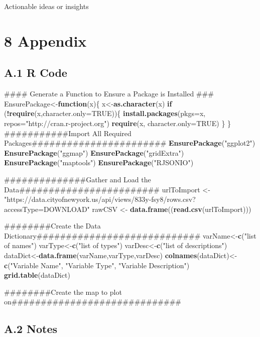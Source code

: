 \documentclass[]{article}
\newenvironment{Shaded}{\begin{snugshade}}{\end{snugshade}}
\newcommand{\KeywordTok}[1]{\textcolor[rgb]{0.13,0.29,0.53}{\textbf{#1}}}
\newcommand{\DataTypeTok}[1]{\textcolor[rgb]{0.13,0.29,0.53}{#1}}
\newcommand{\StringTok}[1]{\textcolor[rgb]{0.31,0.60,0.02}{#1}}
\newcommand{\OtherTok}[1]{\textcolor[rgb]{0.56,0.35,0.01}{#1}}
\newcommand{\ControlFlowTok}[1]{\textcolor[rgb]{0.13,0.29,0.53}{\textbf{#1}}}
\newcommand{\OperatorTok}[1]{\textcolor[rgb]{0.81,0.36,0.00}{\textbf{#1}}}
\newcommand{\AlertTok}[1]{\textcolor[rgb]{0.94,0.16,0.16}{#1}}
\newcommand{\NormalTok}[1]{#1}
\begin{document}
Actionable ideas or insights

\section{8 Appendix}\label{appendix}

\subsection{A.1 R Code}\label{a.1-r-code}

\begin{Shaded}
\begin{Highlighting}[]
\NormalTok{#### Generate a Function to Ensure a Package is Installed }\AlertTok{###}
\NormalTok{EnsurePackage<-}\ControlFlowTok{function}\NormalTok{(x)\{}
\NormalTok{  x<-}\KeywordTok{as.character}\NormalTok{(x)}
  \ControlFlowTok{if}\NormalTok{ (}\OperatorTok{!}\KeywordTok{require}\NormalTok{(x,}\DataTypeTok{character.only=}\OtherTok{TRUE}\NormalTok{))\{}
    \KeywordTok{install.packages}\NormalTok{(}\DataTypeTok{pkgs=}\NormalTok{x, }\DataTypeTok{repos=}\StringTok{"http://cran.r-project.org"}\NormalTok{)}
    \KeywordTok{require}\NormalTok{(x, }\DataTypeTok{character.only=}\OtherTok{TRUE}\NormalTok{)}
\NormalTok{  \}}
\NormalTok{\}}
\NormalTok{###########Import All Required Packages#######################}
\KeywordTok{EnsurePackage}\NormalTok{(}\StringTok{"ggplot2"}\NormalTok{)}
\KeywordTok{EnsurePackage}\NormalTok{(}\StringTok{"ggmap"}\NormalTok{)}
\KeywordTok{EnsurePackage}\NormalTok{(}\StringTok{"gridExtra"}\NormalTok{)}
\KeywordTok{EnsurePackage}\NormalTok{(}\StringTok{"maptools"}\NormalTok{)}
\KeywordTok{EnsurePackage}\NormalTok{(}\StringTok{"RJSONIO"}\NormalTok{)}

\NormalTok{##############Gather and Load the Data########################}
\NormalTok{urlToImport <-}\StringTok{ "https://data.cityofnewyork.us/api/views/833y-fsy8/rows.csv?accessType=DOWNLOAD"}
\NormalTok{rawCSV <-}\StringTok{ }\KeywordTok{data.frame}\NormalTok{((}\KeywordTok{read.csv}\NormalTok{(urlToImport)))}

\NormalTok{########Create the Data Dictionary############################}
\NormalTok{varName<-}\KeywordTok{c}\NormalTok{(}\StringTok{"list of names"}\NormalTok{)}
\NormalTok{varType<-}\KeywordTok{c}\NormalTok{(}\StringTok{"list of types"}\NormalTok{)}
\NormalTok{varDesc<-}\KeywordTok{c}\NormalTok{(}\StringTok{"list of descriptions"}\NormalTok{)}
\NormalTok{dataDict<-}\KeywordTok{data.frame}\NormalTok{(varName,varType,varDesc)}
\KeywordTok{colnames}\NormalTok{(dataDict)<-}\KeywordTok{c}\NormalTok{(}\StringTok{"Variable Name"}\NormalTok{, }\StringTok{"Variable Type"}\NormalTok{, }\StringTok{"Variable Description"}\NormalTok{)}
\KeywordTok{grid.table}\NormalTok{(dataDict)}

\NormalTok{########Create the map to plot on#############################}
\end{Highlighting}
\end{Shaded}

\subsection{A.2 Notes}\label{a.2-notes}
\end{document}
